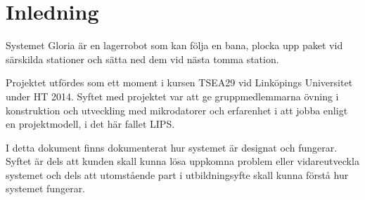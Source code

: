 
\section{Inledning}

Systemet Gloria är en lagerrobot som kan följa en bana, plocka upp paket vid särskilda stationer och sätta ned dem vid nästa tomma station.

Projektet utfördes som ett moment i kursen TSEA29 vid Linköpings Universitet under HT 2014\cite{tsea29}. Syftet med projektet var att ge gruppmedlemmarna övning i konstruktion och utveckling med mikrodatorer och erfarenhet i att jobba enligt en projektmodell, i det här fallet LIPS.

I detta dokument finns dokumenterat hur systemet är designat och fungerar. Syftet är dels att kunden skall kunna lösa uppkomna problem eller vidareutveckla systemet och dels att utomstående part i utbildningsyfte skall kunna förstå hur systemet fungerar.
